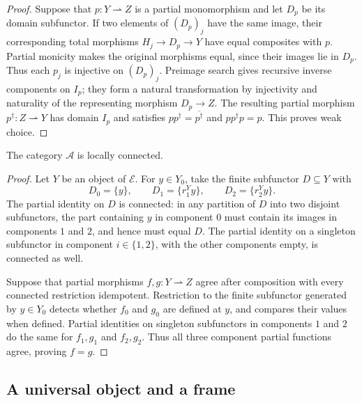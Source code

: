 \begin{proof}
Suppose that $p:Y\rightharpoonup Z$ is a partial monomorphism
and let $D_p$ be its domain subfunctor. If two elements of $(D_p)_j$
have the same image, their corresponding total morphisms
$H_j\to D_p\to Y$ have equal composites with $p$.
Partial monicity makes the original morphisms equal, since their
images lie in $D_p$. Thus each $p_j$ is injective on $(D_p)_j$.
Preimage search gives recursive inverse components on $I_p$;
they form a natural transformation by injectivity and naturality of
the representing morphism $D_p\to Z$.
The resulting partial morphism $p^\dagger:Z\rightharpoonup Y$ has
domain $I_p$ and satisfies $pp^\dagger=\overline{p^\dagger}$ and
$pp^\dagger p=p$.
This proves weak choice.
\end{proof}

\begin{proposition}\label{prop:fork-local}
The category $\mathcal A$ is locally connected.
\end{proposition}
\begin{proof}
Let $Y$ be an object of $\mathcal E$. For $y\in Y_0$, take the
finite subfunctor $D\subseteq Y$ with
\[
 D_0=\{y\},\qquad D_1=\{r_1^Yy\},\qquad D_2=\{r_2^Yy\}.
\]
The partial identity on $D$ is connected: in any partition of $D$
into two disjoint subfunctors, the part containing $y$ in component
$0$ must contain its images in components $1$ and $2$, and hence
must equal $D$. The partial identity on a singleton subfunctor
in component $i\in\{1,2\}$, with the other components empty,
is connected as well.

Suppose that partial morphisms $f,g:Y\rightharpoonup Z$ agree
after composition with every connected restriction idempotent.
Restriction to the
finite subfunctor generated by $y\in Y_0$ detects whether
$f_0$ and $g_0$ are defined at $y$, and compares their values
when defined. Partial identities on singleton subfunctors in
components $1$ and $2$ do the same for $f_1,g_1$ and $f_2,g_2$.
Thus all three component partial functions agree, proving $f=g$.
\end{proof}

\subsection{A universal object and a frame}

